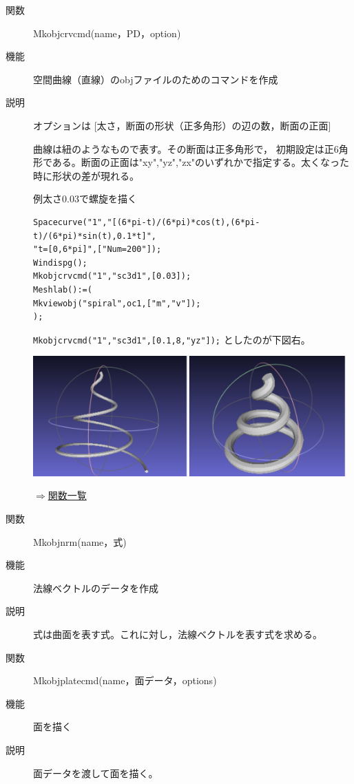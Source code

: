 \documentclass[papersize,a4paper,12pt,uplatex]{jsarticle}
\begin{document}
\begin{description}
\vspace{\baselineskip}
\hypertarget{mkobjcrvcmd}{}
\item[関数]Mkobjcrvcmd(name，PD，option)
\item[機能]空間曲線（直線）のobjファイルのためのコマンドを作成
\item[説明]オプションは [太さ，断面の形状（正多角形）の辺の数，断面の正面]

曲線は紐のようなもので表す。その断面は正多角形で， 初期設定は正6角形である。断面の正面は"xy","yz","zx"のいずれかで指定する。太くなった時に形状の差が現れる。

例太さ0.03で螺旋を描く
\begin{verbatim}
Spacecurve("1","[(6*pi-t)/(6*pi)*cos(t),(6*pi-t)/(6*pi)*sin(t),0.1*t]",
"t=[0,6*pi]",["Num=200"]);
Windispg();
Mkobjcrvcmd("1","sc3d1",[0.03]);
Meshlab():=(
Mkviewobj("spiral",oc1,["m","v"]); 
);
\end{verbatim}

\verb|Mkobjcrvcmd("1","sc3d1",[0.1,8,"yz"]);| としたのが下図右。

 \includegraphics[bb=0 0 614.53 236.51 , width=12cm]{Fig/meshlab02.pdf}

\begin{flushright}\hyperlink{functionlist}{$\Rightarrow$関数一覧}\end{flushright}

\vspace{\baselineskip}
\hypertarget{mkobjnrm}{}
\item[関数]Mkobjnrm(name，式)
\item[機能]法線ベクトルのデータを作成
\item[説明]式は曲面を表す式。これに対し，法線ベクトルを表す式を求める。

\vspace{\baselineskip}
\hypertarget{mkobjplatecmd}{}
\item[関数]Mkobjplatecmd(name，面データ，options)
\item[機能]面を描く
\item[説明]面データを渡して面を描く。


\end{description}
\end{document}
